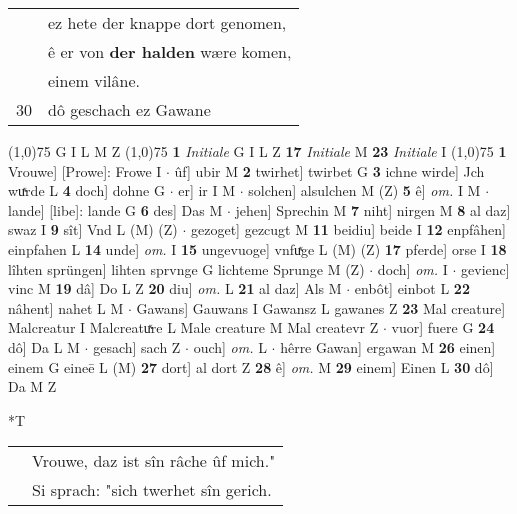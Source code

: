\documentclass[8pt,a4paper,notitlepage]{article}
\begin{document}
\begin{table}[ht]
\begin{minipage}[t]{0.5\linewidth}
\begin{tabular}{rl}
 & ez hete der knappe dort genomen,\\ 
 & ê er von \textbf{der halden} wære komen,\\ 
 & einem vilâne.\\ 
30 & dô geschach ez Gawane\\ 
\end{tabular}
\scriptsize
\line(1,0){75} \newline
G I L M Z \newline
\line(1,0){75} \newline
\textbf{1} \textit{Initiale} G I L Z  \textbf{17} \textit{Initiale} M  \textbf{23} \textit{Initiale} I  \newline
\line(1,0){75} \newline
\textbf{1} Vrouwe] [Prowe]: Frowe I  $\cdot$ ûf] ubir M \textbf{2} twirhet] twirbet G \textbf{3} ichne wirde] Jch wuͯrde L \textbf{4} doch] dohne G  $\cdot$ er] ir I M  $\cdot$ solchen] alsulchen M (Z) \textbf{5} ê] \textit{om.} I M  $\cdot$ lande] [libe]: lande G \textbf{6} des] Das M  $\cdot$ jehen] Sprechin M \textbf{7} niht] nirgen M \textbf{8} al daz] swaz I \textbf{9} sît] Vnd L (M) (Z)  $\cdot$ gezoget] gezcugt M \textbf{11} beidiu] beide I \textbf{12} enpfâhen] einpfahen L \textbf{14} unde] \textit{om.} I \textbf{15} ungevuoge] vnfuͯge L (M) (Z) \textbf{17} pferde] orse I \textbf{18} lîhten sprüngen] lihten sprvnge G lichteme Sprunge M (Z)  $\cdot$ doch] \textit{om.} I  $\cdot$ gevienc] vinc M \textbf{19} dâ] Do L Z \textbf{20} diu] \textit{om.} L \textbf{21} al daz] Als M  $\cdot$ enbôt] einbot L \textbf{22} nâhent] nahet L M  $\cdot$ Gawans] Gauwans I Gawansz L gawanes Z \textbf{23} Mal creature] Malcreatur I Malcreatuͯre L Male creature M Mal createvr Z  $\cdot$ vuor] fuere G \textbf{24} dô] Da L M  $\cdot$ gesach] sach Z  $\cdot$ ouch] \textit{om.} L  $\cdot$ hêrre Gawan] ergawan M \textbf{26} einen] einem G eineē L (M) \textbf{27} dort] al dort Z \textbf{28} ê] \textit{om.} M \textbf{29} einem] Einen L \textbf{30} dô] Da M Z \newline
\end{minipage}
\hspace{0.5cm}
\begin{minipage}[t]{0.5\linewidth}
\small
\begin{center}*T
\end{center}
\begin{tabular}{rl}
 & Vrouwe, daz ist sîn râche ûf mich."\\ 
 & Si sprach: "sich twerhet sîn gerich.\\ 

\end{tabular}
\end{minipage}
\end{table}
\end{document}
